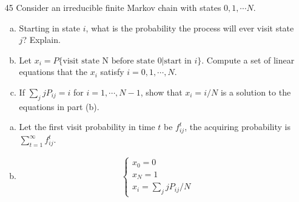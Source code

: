 \documentclass[en,hazy,blue,12pt,device = normal]{elegantnote}
\begin{document}
\begin{enumerate}
    (a) What is the probability that she wins all the games she plays on Tuesday?

    (b) What is the expected number of games that she plays on Wednesday?

    (c) In the long run, on what proportion of days does Capa win all her games.

    \begin{tcolorbox}
        \sol

        \begin{enumerate}[(a)]
            \item \[P = P_{11}p+P_{12}p^2 = 0.2p+0.8p^2\]
            \item \[E(X) = 1\times\left( P_{11}^2 + P_{12}P_{21} \right) + 2\times \left( P_{12}P_{22} + P_{11}P_{12} \right) = 1.48\]
            \item Let \(\pi\) denote the stationary distribution, \(\pi = \pi{\bf P} \). Then \(\pi = (1/3,2/3)\)
        \end{enumerate}
    \end{tcolorbox}
    \item[45] Consider an irreducible finite Markov chain with states \(0,1,\cdots N\).
    \begin{enumerate}[(a)]
        \item  Starting in state \(i\), what is the probability the process will ever visit state \(j \)? Explain.
        \item Let \(x_i = P\{\text{visit state N before state } 0 | \text{start in }i\}\). Compute a set of linear equations that the \(x_i\) satisfy \(i = 0,1,\cdots,N\).
        \item If \(\sum_j jP_{ij } = i\) for \(i = 1,\cdots,N-1\), show that \(x_i = i/N\) is a solution to the equations in part (b).
    \end{enumerate}
    \begin{tcolorbox}
        \sol
        \begin{enumerate}[(a)]
            \item Let the first visit probability in time \(t\) be \(f_{ij }^t\), the acquiring probability is \(\sum_{t = 1}^\infty f_{ij }^t\).
            \item \begin{align*}
                \begin{cases}
                    x_0 = 0 \\
                    x_N = 1 \\
                    x_i = \sum_j jP_{ij } / N
                \end{cases}
            \end{align*}
        \end{enumerate}
    \end{tcolorbox}


\end{enumerate}
\end{document}
